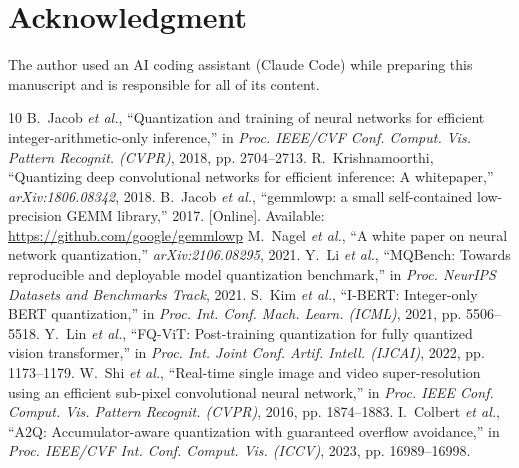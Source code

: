 \documentclass[journal]{IEEEtran}
\begin{document}
\section*{Acknowledgment}
The author used an AI coding assistant (Claude Code) while preparing this manuscript and is responsible for all
of its content.

\begin{thebibliography}{10}
 B.~Jacob \emph{et al.}, ``Quantization and training of neural networks for efficient integer-arithmetic-only
inference,'' in \emph{Proc. IEEE/CVF Conf. Comput. Vis. Pattern Recognit. (CVPR)}, 2018, pp. 2704--2713.
 R.~Krishnamoorthi, ``Quantizing deep convolutional networks for efficient inference: A whitepaper,''
\emph{arXiv:1806.08342}, 2018.
 B.~Jacob \emph{et al.}, ``gemmlowp: a small self-contained low-precision GEMM library,'' 2017. [Online].
Available: \url{https://github.com/google/gemmlowp}
 M.~Nagel \emph{et al.}, ``A white paper on neural network quantization,'' \emph{arXiv:2106.08295}, 2021.
 Y.~Li \emph{et al.}, ``MQBench: Towards reproducible and deployable model quantization benchmark,'' in
\emph{Proc. NeurIPS Datasets and Benchmarks Track}, 2021.
 S.~Kim \emph{et al.}, ``I-BERT: Integer-only BERT quantization,'' in \emph{Proc. Int. Conf. Mach. Learn. (ICML)},
2021, pp. 5506--5518.
 Y.~Lin \emph{et al.}, ``FQ-ViT: Post-training quantization for fully quantized vision transformer,'' in
\emph{Proc. Int. Joint Conf. Artif. Intell. (IJCAI)}, 2022, pp. 1173--1179.
 W.~Shi \emph{et al.}, ``Real-time single image and video super-resolution using an efficient
sub-pixel convolutional neural network,'' in \emph{Proc. IEEE Conf. Comput. Vis. Pattern Recognit. (CVPR)}, 2016,
pp. 1874--1883.
 I.~Colbert \emph{et al.}, ``A2Q: Accumulator-aware quantization with guaranteed overflow avoidance,'' in
\emph{Proc. IEEE/CVF Int. Conf. Comput. Vis. (ICCV)}, 2023, pp. 16989--16998.
\end{thebibliography}
\end{document}
